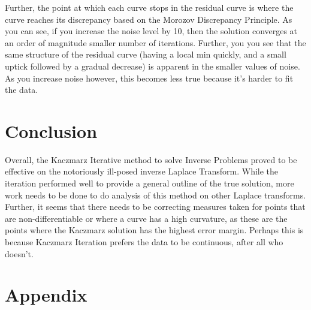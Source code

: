 \documentclass{article}
\begin{document}
Further, the point at which each curve stops in the residual curve is where the curve reaches its discrepancy based on the Morozov Discrepancy Principle. As you can see, if you increase the noise level by 10, then the solution converges at an order of magnitude smaller number of iterations. Further, you you see that the same structure of the residual curve (having a local min quickly, and a small uptick followed by a gradual decrease) is apparent in the smaller values of noise. As you increase noise however, this becomes less true because it's harder to fit the data.

\section{Conclusion}

Overall, the Kaczmarz Iterative method to solve Inverse Problems proved to be effective on the notoriously ill-posed inverse Laplace Transform. While the iteration performed well to provide a general outline of the true solution, more work needs to be done to do analysis of this method on other Laplace transforms. Further, it seems that there needs to be correcting measures taken for points that are non-differentiable or where a curve has a high curvature, as these are the points where the Kaczmarz solution has the highest error margin. Perhaps this is because Kaczmarz Iteration prefers the data to be continuous, after all who doesn't. 

\section{Appendix}
\end{document}
